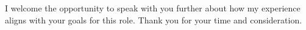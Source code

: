 \documentclass[11pt, a4paper]{awesome-cv}
\begin{document}
\begin{cvletter}
  I welcome the opportunity to speak with you further about how my experience aligns with your goals for this role. Thank you for your time and consideration.

\end{cvletter}


\makeletterclosing
\end{document}
